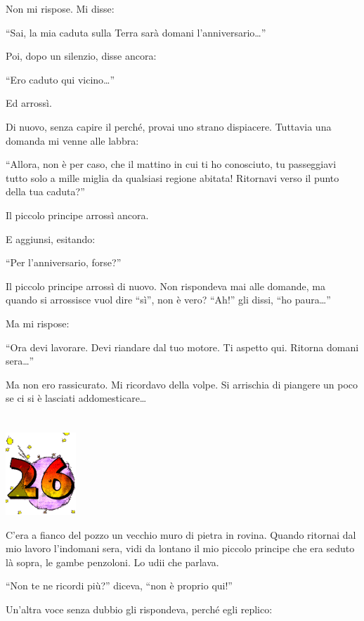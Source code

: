 \documentclass[11pt]{scrbook}
\begin{document}
Non mi rispose. Mi disse:

``Sai, la mia caduta sulla Terra sarà domani l'anniversario\ldots{}''

Poi, dopo un silenzio, disse ancora:

``Ero caduto qui vicino\ldots{}''

Ed arrossì.

Di nuovo, senza capire il perché, provai uno strano dispiacere. Tuttavia una domanda mi venne alle labbra:

``Allora, non è per caso, che il mattino in cui ti ho conosciuto, tu passeggiavi tutto solo a mille miglia da qualsiasi regione abitata! Ritornavi verso il punto della tua caduta?''

Il piccolo principe arrossì ancora.

E aggiunsi, esitando:

``Per l'anniversario, forse?''

Il piccolo principe arrossì di nuovo. Non rispondeva mai alle domande, ma quando si arrossisce vuol dire ``sì'', non è vero? ``Ah!'' gli dissi, ``ho paura\ldots{}''

Ma mi rispose:

``Ora devi lavorare. Devi riandare dal tuo motore. Ti aspetto qui. Ritorna domani sera\ldots{}''

Ma non ero rassicurato. Mi ricordavo della volpe. Si arrischia di piangere un poco se ci si è lasciati addomesticare\ldots{}

\chapter{}
\begin{center}
\includegraphics{img/chapter26}
\end{center}

C'era a fianco del pozzo un vecchio muro di pietra in rovina. Quando ritornai dal mio lavoro l'indomani sera, vidi da lontano il mio piccolo principe che era seduto là sopra, le gambe penzoloni. Lo udii che parlava.

``Non te ne ricordi più?'' diceva, ``non è proprio qui!''

Un'altra voce senza dubbio gli rispondeva, perché egli replico:
\end{document}
